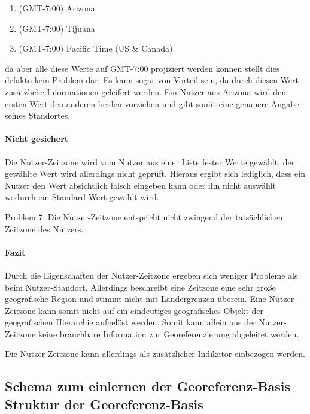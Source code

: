 					\begin{enumerate}
					  	\item (GMT-7:00) Arizona
					  	\item (GMT-7:00) Tijuana 
					  	\item (GMT-7:00) Pacific Time (US & Canada)   
					  \end{enumerate}  

					  da aber alle diese Werte auf GMT-7:00 projiziert werden können stellt dies defakto kein Problem dar. 
					  Es kann sogar von Vorteil sein, da durch diesen Wert zusätzliche Informationen geleifert werden.
					  Ein Nutzer aus Arizona wird den ersten Wert den anderen beiden vorziehen und gibt somit eine genauere Angabe seines Standortes. 

				\paragraph{Nicht gesichert} 

				Die Nutzer-Zeitzone wird vom Nutzer aus einer Liste fester Werte gewählt, der gewählte Wert wird allerdings nicht geprüft.
				Hieraus ergibt sich lediglich, dass ein Nutzer den Wert absichtlich falsch eingeben kann oder ihn nicht auswählt wodurch ein Standard-Wert gewählt wird.

				Problem 7: Die Nutzer-Zeitzone entspricht nicht zwingend der tatsächlichen Zeitzone des Nutzers.

				\paragraph{Fazit}

				Durch die Eigenschaften der Nutzer-Zeitzone ergeben sich weniger Probleme als beim Nutzer-Standort.
				Allerdings beschreibt eine Zeitzone eine sehr große geografische Region und stimmt nicht mit Ländergrenzen überein.
				Eine Nutzer-Zeitzone kann somit nicht auf ein eindeutiges geografisches Objekt der geografischen Hierarchie aufgelöst werden.
				Somit kann allein aus der Nutzer-Zeitzone keine brauchbare Information zur Georeferenzierung abgeleitet werden. 
				
				Die Nutzer-Zeitzone kann allerdings als zusätzlicher Indikator einbezogen werden.


				\subsection{Schema zum einlernen der Georeferenz-Basis  Struktur der Georeferenz-Basis}			
					
